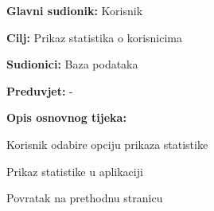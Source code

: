 				
					\noindent {}
					\begin{packed_item}
						
						\item \textbf{Glavni sudionik: }Korisnik
						\item  \textbf{Cilj:} Prikaz statistika o korisnicima 
						\item  \textbf{Sudionici:} Baza podataka
						\item  \textbf{Preduvjet:} -
						\item  \textbf{Opis osnovnog tijeka:}
						
						\item[] \begin{packed_enum}
							
							\item Korisnik odabire opciju prikaza statistike
							\item Prikaz statistike u aplikaciji
							\item Povratak na prethodnu stranicu
							
						\end{packed_enum}
						
					\end{packed_item}
				
